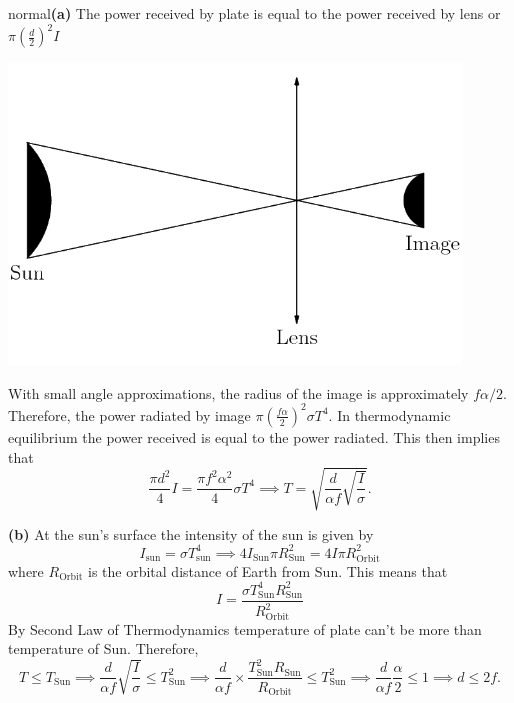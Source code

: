 \begin{solution}{normal}\textbf{(a)} The power received by plate is equal to the power received by lens  or $\pi\left(\frac{d}{2}\right)^2I$
\begin{center}
    \includegraphics[width=12cm]{0A5C0D21-84E2-4E18-9164-078E0A965068.png}
\end{center}
With small angle approximations, the radius of the image is approximately $f\alpha/2$. Therefore, the power radiated by image $\pi\left(\frac{f\alpha}{2}\right)^2\sigma T^4$. In thermodynamic equilibrium the power received is equal to the power radiated. This then implies that 
\[ \frac{\pi d^2}{4} I = \frac{\pi f^2 \alpha^2}{4}\sigma T^4\implies T = \sqrt {\frac{d}{\alpha f}\sqrt {\frac{I}{\sigma}}}.\]
\vspace{3mm}

\noindent \textbf{(b)} At the sun’s surface the intensity of the sun is given by $$I_{\text{sun}} = \sigma T_{\text{sun}}^4\implies 4I_{\text{Sun}}\pi R_{\text{Sun}}^2 = 4 I \pi R_{\text{Orbit}}^2$$
where $R_{\text{Orbit}}$ is the orbital distance of Earth from Sun. This means that
$$I = \frac{\sigma T_{\text{Sun}}^4 R_{\text{Sun}}^2}{R_{\text{Orbit}}^2}$$
By Second Law of Thermodynamics temperature of plate can’t be more than temperature of Sun.
Therefore, $$T \leq T_{\text{Sun}}\implies \frac{d}{\alpha f}\sqrt {\frac{I}{\sigma}} \leq T_{\text{Sun}}^2\implies \frac{d}{\alpha f} \times \frac{T_{\text{Sun}}^2 R_{\text{Sun}}}{R_{\text{Orbit}}} \leq T_{\text{Sun}}^2\implies \frac {d}{\alpha f} \frac{\alpha}{2}\leq 1 \implies \boxed {d \leq 2f}.$$


\end{solution}